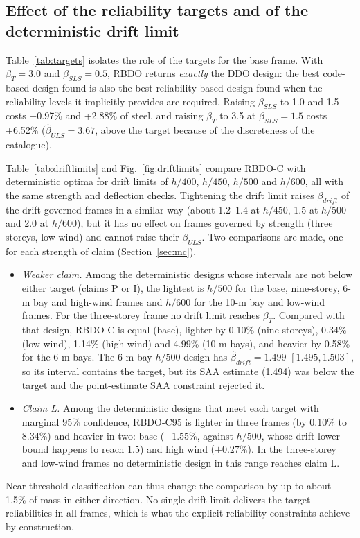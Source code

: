 \subsection{Effect of the reliability targets and of the deterministic drift limit}\label{sec:targets}

Table~\ref{tab:targets} isolates the role of the targets for the base frame. With $\beta_T=3.0$ and
$\beta_{SLS}=0.5$, RBDO returns \emph{exactly} the DDO design: the best code-based design found is
also the best reliability-based design found when the reliability levels it implicitly provides are
required. Raising
$\beta_{SLS}$ to 1.0 and 1.5 costs +0.97\% and +2.88\% of steel, and raising $\beta_T$ to 3.5 at
$\beta_{SLS}=1.5$ costs +6.52\% ($\hat\beta_{ULS}=3.67$, above the target because of the
discreteness of the catalogue).

Table~\ref{tab:driftlimits} and Fig.~\ref{fig:driftlimits} compare RBDO-C with deterministic
optima for drift limits of $h/400$, $h/450$, $h/500$ and $h/600$, all with the same strength and
deflection checks. Tightening the drift limit raises $\beta_{drift}$ of the drift-governed frames
in a similar way (about 1.2--1.4 at $h/450$, 1.5 at $h/500$ and 2.0 at $h/600$), but it has no
effect on frames governed by strength (three storeys, low wind) and cannot raise their
$\beta_{ULS}$. Two comparisons are made, one for each strength of claim (Section~\ref{sec:mc}).
\begin{itemize}
\item \emph{Weaker claim.} Among the deterministic designs whose intervals are not below either
target (claims P or I), the lightest is $h/500$ for the base, nine-storey, 6-m bay and high-wind
frames and $h/600$ for the 10-m bay and low-wind frames. For the three-storey frame no drift limit
reaches $\beta_T$. Compared with that design, RBDO-C is equal (base), lighter by 0.10\% (nine
storeys), 0.34\% (low wind), 1.14\% (high wind) and 4.99\% (10-m bays), and heavier by 0.58\% for the
6-m bays. The 6-m bay $h/500$ design has $\hat\beta_{drift}=1.499$ $[1.495, 1.503]$, so its interval
contains the target, but its SAA estimate (1.494) was below the target and the point-estimate SAA
constraint rejected it.
\item \emph{Claim L.} Among the deterministic designs that meet each target with marginal $95\%$ confidence,
RBDO-C95 is lighter in three frames (by 0.10\% to 8.34\%) and heavier in two: base
($+1.55\%$, against $h/500$, whose drift lower bound happens to reach 1.5) and high wind
($+0.27\%$). In the three-storey and low-wind frames no deterministic design in this range reaches
claim L.
\end{itemize}
Near-threshold classification can thus change the comparison by up to about 1.5\% of mass in
either direction. No single drift limit delivers the target
reliabilities in all frames, which is what the explicit reliability constraints achieve by
construction.

